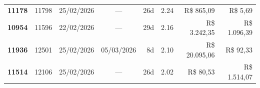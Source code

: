 \documentclass[a4paper,10pt]{article}
\begin{document}
\begin{center}
\begin{longtable}{>{\scriptsize}r>{\scriptsize}r>{\scriptsize}c>{\scriptsize}c>{\scriptsize}r>{\scriptsize}r>{\scriptsize}r>{\scriptsize}r}
\textcolor{anomyellow}{\textbf{11178}} & 11798 & 25/02/2026 & — & 26d & \textcolor{anomyellow}{2.24} & R\$ 865,09 & \textcolor{anomred}{R\$ 5,69} \\

\textcolor{anomyellow}{\textbf{10954}} & 11596 & 22/02/2026 & — & 29d & \textcolor{anomyellow}{2.16} & R\$ 3.242,35 & \textcolor{anomred}{R\$ 1.096,39} \\

\textcolor{anomyellow}{\textbf{11936}} & 12501 & 25/02/2026 & 05/03/2026 & 8d & \textcolor{anomyellow}{2.10} & R\$ 20.095,06 & \textcolor{anomred}{R\$ 92,33} \\

\textcolor{anomyellow}{\textbf{11514}} & 12106 & 25/02/2026 & — & 26d & \textcolor{anomyellow}{2.02} & R\$ 80,53 & \textcolor{anomred}{R\$ 1.514,07} \\

\end{longtable}\end{center}
\end{document}
